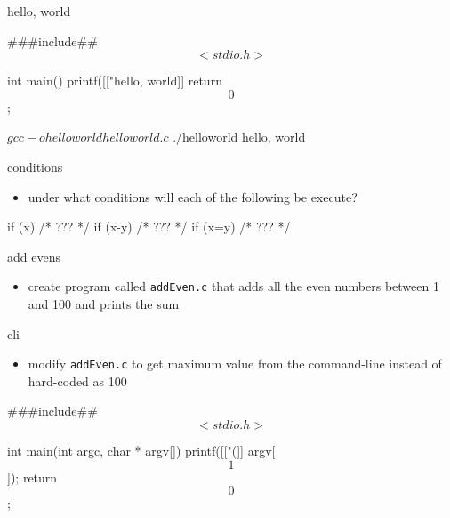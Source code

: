 \documentclass[10pt,t]{beamer}
\begin{document}
  \begin{frame}[fragile]{hello, world}
    \begin{codeblock}
    ###include## $$<stdio.h>$$

    int main() {
      printf([["hello, world]]%
      return $$0$$;
    }
    \end{codeblock}

    \begin{termblock}
    $ gcc -o helloworld helloworld.c
    $ ./helloworld
    hello, world
    \end{termblock}

  \end{frame}

  \begin{frame}[fragile]{conditions}
    \begin{itemize}
      \item under what conditions will each of the following be execute?
    \end{itemize}
    \begin{codeblock}
    if (x) {
      /* ??? */
    }
    if (x-y) {
      /* ??? */
    }
    if (x=y) {
      /* ??? */
    }
    \end{codeblock}

  \end{frame}

  \begin{frame}{add evens}
    \begin{itemize}
      \item create program called \texttt{addEven.c} that adds all the even
        numbers between 1 and 100 and prints the sum
    \end{itemize}
  \end{frame}

  \begin{frame}[fragile]{cli}
    \begin{itemize}
      \item modify \texttt{addEven.c} to get maximum value from the command-line
        instead of hard-coded as 100
    \end{itemize}

    \begin{codeblock}
    ###include## $$<stdio.h>$$

    int main(int argc, char * argv[]) {
      printf([["(]]%
        argv[$$1$$]);
      return $$0$$;
    }
    \end{codeblock}
  \end{frame}
\end{document}
